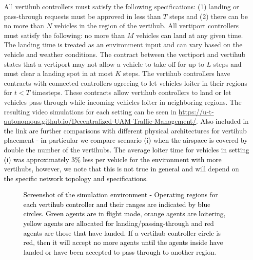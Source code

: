 All vertihub controllers must satisfy the following specifications: (1) landing or pass-through requests must be approved in less than $T$ steps and (2) there can be no more than $N$ vehicles in the region of the vertihub. 
All vertiport controllers must satisfy the following: no more than $M$ vehicles can land at any given time. The landing time is treated as an environment input and can vary based on the vehicle and weather conditions. The contract between the vertiport and vertihub states that a vertiport may not allow a vehicle to take off for up to $L$ steps and must clear a landing spot in at most $K$ steps. The vertihub controllers have contracts with connected controllers agreeing to let vehicles loiter in their regions for $t < T$ timesteps. These contracts allow vertihub controllers to land or let vehicles pass through while incoming vehicles loiter in neighboring regions.
The resulting video simulations for each setting can be seen in  \href{https://u-t-autonomous.github.io/Decentralized-UAM-Traffic-Management/}{https://u-t-autonomous.github.io/Decentralized-UAM-Traffic-Management/}.
\textcolor{black}{Also included in the link are further comparisons with different physical architectures for vertihub placement - in particular we compare scenario (i) when the airspace is covered by double the number of the vertihubs. The average loiter time for vehicles in setting (i) was approximately 3\% less per vehicle for the environment with more vertihubs, however, we note that this is not true in general and will depend on the specific network topology and specifications.}
\begin{figure}
    \centering
    \caption{
    \textcolor{black}{Screenshot of the simulation environment - Operating regions for each vertihub controller and their ranges are indicated by blue circles.
     Green agents are in flight mode, orange agents are loitering, yellow agents are allocated for landing/passing-through and red agents are those that have landed. If a vertihub controller circle is red, then it will accept no more agents until the agents inside have landed or have been accepted to pass through to another region.
     }
    }
    \label{fig:sim}
\end{figure}

